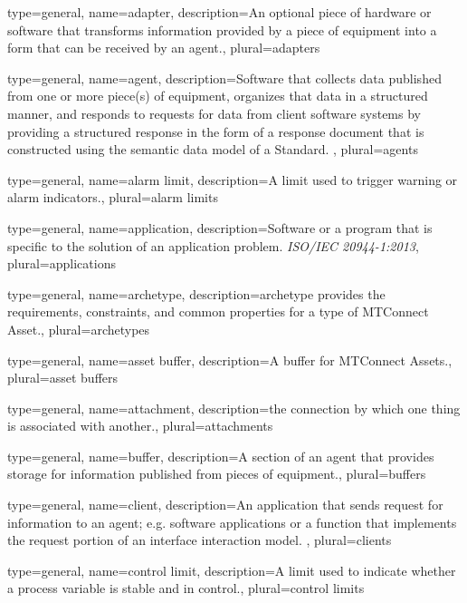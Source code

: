 
{
	type={general},
    name={adapter},
	description={An optional piece of hardware or software that transforms information provided by a piece of equipment into a form that can be received by an \gls{agent}.},
	plural={adapters}
}

{
	type={general},
    name={agent},
	description={Software that collects data published from one or more piece(s) of equipment, organizes that data in a structured manner, and responds to requests for data from client software systems by providing a structured response in the form of a \gls{response document} that is constructed using the \gls{semantic data model} of a Standard. 
},
	plural={agents}
}

{
	type={general},
    name={alarm limit},
	description={A limit used to trigger warning or alarm indicators.},
	plural={alarm limits}
}

{
	type={general},
    name={application},
	description={Software or a program that is specific to the solution of an application problem.
\textit{ISO/IEC 20944-1:2013}},
	plural={applications}
}

{
	type={general},
    name={archetype},
	description={\gls{archetype} provides the requirements, constraints, and common properties for a type of \gls{MTConnect Asset}.},
	plural={archetypes}
}

{
	type={general},
    name={asset buffer},
	description={A \gls{buffer} for \glspl{MTConnect Asset}.},
	plural={asset buffers}
}

{
	type={general},
    name={attachment},
	description={the connection by which one thing is associated with another.},
	plural={attachments}
}

{
	type={general},
    name={buffer},
	description={A section of an \gls{agent} that provides storage for information published from pieces of equipment.},
	plural={buffers}
}

{
	type={general},
    name={client},
	description={An \gls{application} that sends \gls{request} for information to an \gls{agent}; e.g. software applications or a function that implements the \gls{request} portion of an \gls{interface} \gls{interaction model}.
},
	plural={clients}
}

{
	type={general},
    name={control limit},
	description={A limit used to indicate whether a process variable is stable and in control.},
	plural={control limits}
}

